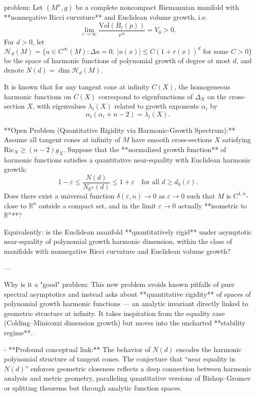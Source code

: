 problem:  
Let \( (M^n,g) \) be a complete noncompact Riemannian manifold with **nonnegative Ricci curvature** and Euclidean volume growth, i.e.  
\[
\lim_{r\to\infty}\frac{\mathrm{Vol}(B_r(p))}{r^n}=V_0>0.
\]
For \(d>0\), let
\[
\mathcal{H}_d(M)=\{u\in C^\infty(M):\Delta u=0,\ |u(x)|\le C(1+r(x))^d \text{ for some }C>0\}
\]
be the space of harmonic functions of polynomial growth of degree at most \(d\), and denote \(N(d)=\dim\mathcal{H}_d(M)\).

It is known that for any tangent cone at infinity \(C(X)\), the homogeneous harmonic functions on \(C(X)\) correspond to eigenfunctions of \(\Delta_X\) on the cross-section \(X\), with eigenvalues \(\lambda_i(X)\) related to growth exponents \(\alpha_i\) by  
\[
\alpha_i(\alpha_i+n-2)=\lambda_i(X).
\]

**Open Problem (Quantitative Rigidity via Harmonic-Growth Spectrum):**  
Assume all tangent cones at infinity of \(M\) have smooth cross-sections \(X\) satisfying \(\mathrm{Ric}_X\ge(n-2)g_X\).  
Suppose that the **normalized growth function** of harmonic functions satisfies a quantitative near-equality with Euclidean harmonic growth:
\[
1-\varepsilon \le \frac{N(d)}{N_{\mathbb{R}^n}(d)} \le 1+\varepsilon \quad\text{for all }d\ge d_0(\varepsilon).
\]
Does there exist a universal function \(\delta(\varepsilon,n)\to0\) as \(\varepsilon\to0\) such that \(M\) is \(C^{1,\alpha}\)-close to \(\mathbb{R}^n\) outside a compact set, and in the limit \(\varepsilon\to0\) actually **isometric to \(\mathbb{R}^n\)**?

Equivalently: is the Euclidean manifold **quantitatively rigid** under asymptotic near-equality of polynomial growth harmonic dimension, within the class of manifolds with nonnegative Ricci curvature and Euclidean volume growth?

---

Why is it a "good" problem:  
This new problem avoids known pitfalls of pure spectral asymptotics and instead asks about **quantitative rigidity** of spaces of polynomial growth harmonic functions — an analytic invariant directly linked to geometric structure at infinity. It takes inspiration from the equality case (Colding–Minicozzi dimension growth) but moves into the uncharted **stability regime**.

- **Profound conceptual link:**  
  The behavior of \(N(d)\) encodes the harmonic polynomial structure of tangent cones. The conjecture that “near equality in \(N(d)\)” enforces geometric closeness reflects a deep connection between harmonic analysis and metric geometry, paralleling quantitative versions of Bishop–Gromov or splitting theorems but through analytic function spaces.  

